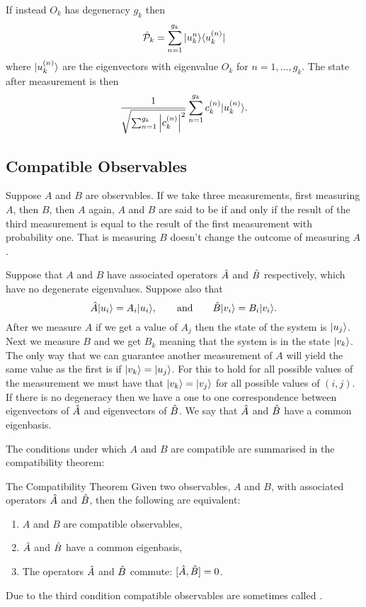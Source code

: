     If instead \(O_k\) has degeneracy \(g_k\) then
    \[\hat{\mathcal{P}}_k = \sum_{n=1}^{g_k} \vert {u_k^{n}}\rangle\langle {u_k^{(n)}} \vert\]
    where \(\vert {u_k^{(n)}} \rangle\) are the eigenvectors with eigenvalue \(O_k\) for \(n = 1, \dotsc, g_k\).
    The state after measurement is then
    \[\frac{1}{\sqrt{\sum_{n=1}^{g_k}\abs{c_k^{(n)}}^2}} \sum_{n=1}^{g_k}c_k^{(n)} \vert {u_k^{(n)}} \rangle.\]
    
    \subsection{Compatible Observables}
    Suppose \(A\) and \(B\) are observables.
    If we take three measurements, first measuring \(A\), then \(B\), then \(A\) again, \(A\) and \(B\) are said to be  if and only if the result of the third measurement is equal to the result of the first measurement with probability one.
    That is measuring \(B\) doesn't change the outcome of measuring \(A\).
    
    Suppose that \(A\) and \(B\) have associated operators \(\hat{A}\) and \(\hat{B}\) respectively, which have no degenerate eigenvalues.
    Suppose also that
    \[\hat{A}\vert {u_i} \rangle = A_i\vert {u_i} \rangle, \qquad\text{and}\qquad \hat{B}\vert {v_i} \rangle = B_i\vert {v_i} \rangle.\]
    After we measure \(A\) if we get a value of \(A_j\) then the state of the system is \(\vert {u_j} \rangle\).
    Next we measure \(B\) and we get \(B_k\) meaning that the system is in the state \(\vert {v_k} \rangle\).
    The only way that we can guarantee another measurement of \(A\) will yield the same value as the first is if \(\vert {v_k} \rangle = \vert {u_j} \rangle\).
    For this to hold for all possible values of the measurement we must have that \(\vert {v_k} \rangle = \vert {v_j} \rangle\) for all possible values of \((i, j)\).
    If there is no degeneracy then we have a one to one correspondence between eigenvectors of \(\hat{A}\) and eigenvectors of \(\hat{B}\).
    We say that \(\hat{A}\) and \(\hat{B}\) have a common eigenbasis.
    
    The conditions under which \(A\) and \(B\) are compatible are summarised in the compatibility theorem:
    \begin{theorem}{The Compatibility Theorem}{}
        Given two observables, \(A\) and \(B\), with associated operators \(\hat{A}\) and \(\hat{B}\), then the following are equivalent:
        \begin{enumerate}
            \item \(A\) and \(B\) are compatible observables,
            \item \(\hat{A}\) and \(\hat{B}\) have a common eigenbasis,
            \item The operators \(\hat{A}\) and \(\hat{B}\) commute: \([\hat{A}, \hat{B}] = 0\).
        \end{enumerate}
    \end{theorem}
    Due to the third condition compatible observables are sometimes called .
    
